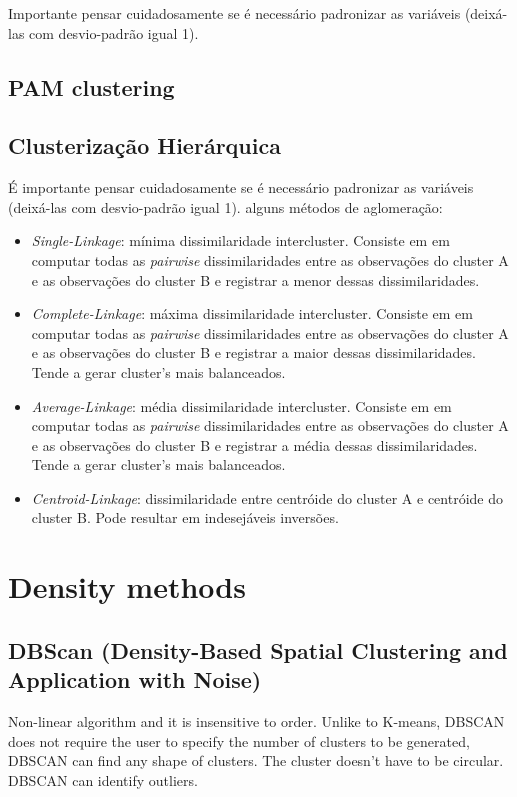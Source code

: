 Importante pensar cuidadosamente se é necessário padronizar as variáveis (deixá-las com desvio-padrão igual 1).
    
\subsection{PAM clustering}
\subsection{Clusterização Hierárquica}

É importante pensar cuidadosamente se é necessário padronizar as variáveis (deixá-las com desvio-padrão igual 1). alguns métodos de aglomeração:
\begin{itemize}

\item \textit{Single-Linkage}: mínima dissimilaridade intercluster. Consiste em em computar todas as \textit{pairwise} dissimilaridades entre as observações do cluster A e as observações do cluster B e registrar a menor dessas dissimilaridades.

\item \textit{Complete-Linkage}: máxima dissimilaridade intercluster. Consiste em em computar todas as \textit{pairwise} dissimilaridades entre as observações do cluster A e as observações do cluster B e registrar a maior dessas dissimilaridades. Tende a gerar cluster's mais balanceados.

\item \textit{Average-Linkage}: média dissimilaridade intercluster. Consiste em em computar todas as \textit{pairwise} dissimilaridades entre as observações do cluster A e as observações do cluster B e registrar a média dessas dissimilaridades.
Tende a gerar cluster's mais balanceados.

\item \textit{Centroid-Linkage}: dissimilaridade entre centróide do cluster A e centróide do cluster B. Pode resultar em indesejáveis inversões.

\end{itemize}

\section{Density methods}
\subsection{DBScan (Density-Based Spatial Clustering and Application with Noise)} Non-linear algorithm and it is insensitive to order. Unlike to K-means, DBSCAN does not require the user to specify the number of clusters to be generated, DBSCAN can find any shape of clusters. The cluster doesn’t have to be circular. DBSCAN can identify outliers.

